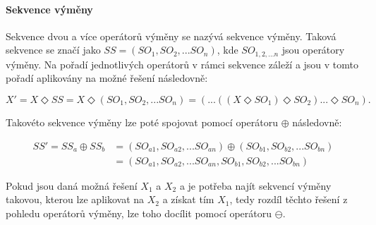 \paragraph{Sekvence výměny}
Sekvence dvou a více operátorů výměny se nazývá sekvence výměny. Taková sekvence se značí jako $SS = (SO_1, SO_2, ... SO_n)$, kde $SO_{1,2,...n}$ jsou operátory výměny. Na pořadí jednotlivých operátorů v rámci sekvence záleží a jsou v tomto pořadí aplikovány na možné řešení následovně:

$$
X' = X \Diamond SS = X \Diamond (SO_1, SO_2, ... SO_n) = (...((X \Diamond SO_1) \Diamond SO_2) ... \Diamond SO_n).
$$

Takovéto sekvence výměny lze poté spojovat pomocí operátoru $\oplus$ následovně:

\begin{equation*}
    \begin{split}
        SS' = SS_a \oplus SS_b &= (SO_{a1}, SO_{a2}, ... SO_{an}) \oplus (SO_{b1}, SO_{b2}, ... SO_{bn}) \\
                               &= (SO_{a1}, SO_{a2}, ... SO_{an}, SO_{b1}, SO_{b2}, ... SO_{bn})
    \end{split}
\end{equation*}

Pokud jsou daná možná řešení $X_1$ a $X_2$ a je potřeba najít sekvencí výměny takovou, kterou lze aplikovat na $X_2$ a získat tím $X_1$, tedy rozdíl těchto řešení z pohledu operátorů výměny, lze toho docílit pomocí operátoru $\ominus$.

